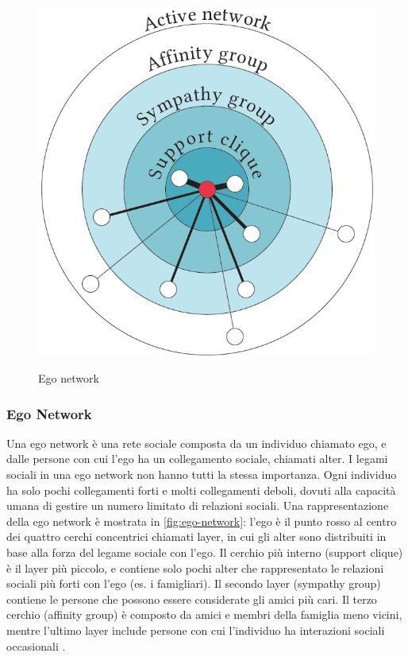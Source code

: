 \documentclass[12pt,italian]{report}
\begin{document}
\begin{figure}
  \centering
  \includegraphics[scale=0.50]{immagini/ego-network.png}
  \caption{Ego network}
  \label{fig:ego-network}
  \cite{ego-net}
\end{figure}

\subsubsection{Ego Network}
Una ego network è una rete sociale composta da un individuo chiamato ego, e dalle persone con cui l'ego ha un collegamento sociale, chiamati alter. I legami sociali in una ego network non hanno tutti la stessa importanza. Ogni individuo ha solo pochi collegamenti forti e molti collegamenti deboli, dovuti alla capacità umana di gestire un numero limitato di relazioni sociali. Una rappresentazione della ego network è mostrata in \autoref{fig:ego-network}: l'ego è il punto rosso al centro dei quattro cerchi concentrici chiamati layer, in cui gli alter sono distribuiti in base alla forza del legame sociale con l'ego. Il cerchio più interno (support clique) è il layer più piccolo, e contiene solo pochi alter che rappresentato le relazioni sociali più forti con l'ego (es. i famigliari). Il secondo layer (sympathy group) contiene le persone che possono essere considerate gli amici più cari. Il terzo cerchio (affinity group) è composto da amici e membri della famiglia meno vicini, mentre l'ultimo layer include persone con cui l'individuo ha interazioni sociali occasionali \cite{ego-net}.
\end{document}
